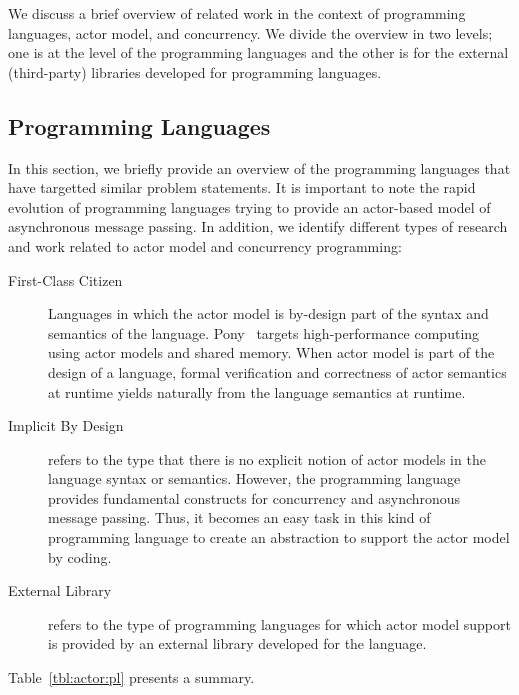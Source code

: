 We discuss a brief overview of related work in the context of programming languages, actor model, and concurrency.
We divide the overview in two levels; one is at the level of the programming languages and the other is for the external (third-party) libraries developed for programming languages.

\subsection{Programming Languages}
\label{sec:intro:proglangs}

In this section, we briefly provide an overview of the programming languages that have targetted similar problem statements.
It is important to note the rapid evolution of programming languages trying to provide an actor-based model of asynchronous message passing.
In addition, we identify different types of research and work related to actor model and concurrency programming:
\begin{description}
\item[First-Class Citizen]
Languages in which the actor model is by-design part of the syntax and 
semantics of the language.
Pony~\cite{ponylang,ClebschD13} targets high-performance 
computing using actor models and shared memory. 
When actor model is part of the design of a language, formal verification
and correctness of actor semantics at runtime yields naturally from the 
language semantics at runtime.
\item[Implicit By Design]
refers to the type that there is no explicit notion of actor models in the language syntax or semantics.
However, the programming language provides fundamental constructs for concurrency and asynchronous message passing.
Thus, it becomes an easy task in this kind of programming language to create an abstraction to support the actor model by coding.
\item[External Library]
refers to the type of programming languages for which actor model support is provided by an external library developed for the language.
\end{description}


Table~\ref{tbl:actor:pl} presents a summary.

